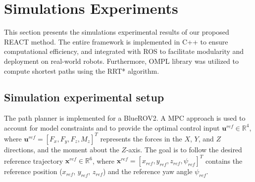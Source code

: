 \section{Simulations Experiments}
\label{sec:simulationexperiments}





%
%








This section presents the simulations experimental results of our proposed \ac{REACT} method. The entire framework is implemented in C++ to ensure computational efficiency, and integrated with ROS to facilitate modularity and  deployment on real-world robots. Furthermore, \ac{OMPL} library \cite{ompl} was utilized to compute shortest paths using the RRT* algorithm.  


\subsection{Simulation experimental setup }
The path planner is implemented for a BlueROV2. A \ac{MPC} approach is used to account for model constraints and to provide the optimal control input $\mathbf{u}^{ref} \in \mathbb{R}^4$, where $\mathbf{u}^{ref} = [F_x, F_y, F_z, M_z]^T$ represents the forces in the $X$, $Y$, and $Z$ directions, and the moment about the $Z$-axis. The goal is to follow the desired reference trajectory $\mathbf{x}^{ref} \in \mathbb{R}^6$, where $\mathbf{x}^{ref} = [x_{ref}, y_{ref}, z_{ref}, \psi_{ref}]^T$ contains the reference position ($x_{ref}$, $y_{ref}$, $z_{ref}$) and the reference yaw angle $\psi_{ref}$.

